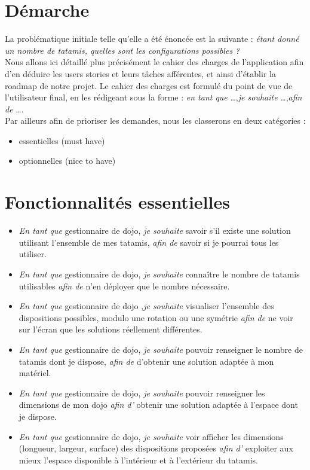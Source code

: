 \section{Démarche}

La problématique initiale telle qu'elle a été énoncée est la suivante : \emph{étant donné un nombre de tatamis, quelles sont les 
configurations possibles ?}\\


Nous allons ici détaillé plus précisément le cahier des charges de l'application afin d'en déduire
les users stories et leurs tâches afférentes, et ainsi d'établir la roadmap de notre projet. Le cahier des charges est formulé 
du point de vue de l'utilisateur final, en les rédigeant sous la forme : \emph{en tant que} \dots ,\emph{je souhaite} \dots ,\emph{afin de } \dots.\\


Par ailleurs afin de prioriser les demandes, nous les classerons en deux catégories :

\begin{itemize}
    \item essentielles (must have)
    \item optionnelles (nice to have)
\end{itemize}

\section{Fonctionnalités essentielles}


\begin{itemize}
    \item \emph{En tant que} gestionnaire de dojo, \emph{ je souhaite} savoir s'il existe une solution utilisant l'ensemble de mes tatamis,
    \emph{afin de } savoir si je pourrai tous les utiliser.
    \item \emph{En tant que} gestionnaire de dojo,\emph{ je souhaite} connaître le nombre de tatamis utilisables \emph{ afin de }
     n'en déployer que le nombre nécessaire.
    \item \emph{En tant que} gestionnaire de dojo  ,\emph{je souhaite} visualiser l'ensemble des dispositions possibles, modulo une rotation ou une symétrie
    \emph{afin de } ne voir sur l'écran que les solutions réellement différentes.
    \item \emph{En tant que} gestionnaire de dojo, \emph{ je souhaite} pouvoir renseigner le nombre de tatamis dont je dispose,
    \emph{afin de } d'obtenir une solution adaptée à mon matériel.
    \item \emph{En tant que} gestionnaire de dojo,\emph{ je souhaite} pouvoir renseigner les dimensions de mon dojo \emph{ afin d'}
     obtenir une solution adaptée à l'espace dont je dispose.    
    \item \emph{En tant que} gestionnaire de dojo,\emph{ je souhaite} voir afficher les dimensions (longueur, largeur, surface) des dispositions 
    proposées  \emph{ afin d' }exploiter aux mieux l'espace disponible à l'intérieur et à l'extérieur du tatamis.
\end{itemize}
